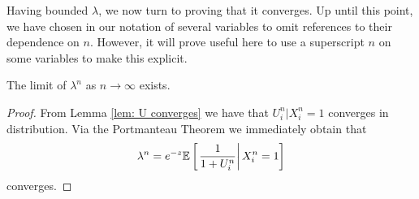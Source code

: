 	Having bounded $\lambda$, we now turn to proving that it converges.
	Up until this point, we have chosen in our notation of several variables to omit references to their dependence on $n$. However, it will prove useful here to use a superscript $n$ on some variables to make this explicit. 

	\begin{lemma}
		The limit of $\lambda^n$ as $n \rightarrow \infty$ exists.
	\end{lemma}
	\begin{proof}
		From Lemma \ref{lem: U converges} we have that $U_i^n | X_i^n = 1$ converges in distribution. Via the Portmanteau Theorem \cite[Theorem 25.8]{Billingsley1995-en} we immediately obtain that
		\begin{equation}
			\lambda^n = e^{-z} \mathbb{E} \left[\left.\frac{1}{1 + U_i^n}\right| X_i^n = 1\right]
		\end{equation}
		converges. 
	\end{proof}







